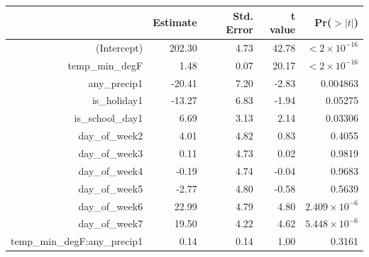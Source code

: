\documentclass[11pt,notitlepage]{article}
\newenvironment{codeSmall}%
   {\par\noindent\adjustbox{margin=1ex,bgcolor=shadecolor,margin=0ex \medskipamount}\bgroup\minipage\linewidth\verbatim\footnotesize}%
   {\endverbatim\endminipage\egroup}
\begin{document}


\begin{table}[ht]
\footnotesize
\centering
\begin{tabular}{rrrrr}
  \hline
 & Estimate & Std. Error & t value & Pr($>|t|$) \\ 
  \hline
(Intercept) & 202.30 & 4.73 & 42.78 & $<2 \times 10^{-16}$ \\ 
  temp\_min\_degF & 1.48 & 0.07 & 20.17 & $<2 \times 10^{-16}$ \\ 
  any\_precip1 & -20.41 & 7.20 & -2.83 & 0.004863 \\ 
  is\_holiday1 & -13.27 & 6.83 & -1.94 & 0.05275 \\ 
  is\_school\_day1 & 6.69 & 3.13 & 2.14 & 0.03306 \\ 
  day\_of\_week2 & 4.01 & 4.82 & 0.83 & 0.4055 \\ 
  day\_of\_week3 & 0.11 & 4.73 & 0.02 & 0.9819 \\ 
  day\_of\_week4 & -0.19 & 4.74 & -0.04 & 0.9683 \\ 
  day\_of\_week5 & -2.77 & 4.80 & -0.58 & 0.5639 \\ 
  day\_of\_week6 & 22.99 & 4.79 & 4.80 & $2.409 \times 10^{-6}$ \\ 
  day\_of\_week7 & 19.50 & 4.22 & 4.62 & $5.448 \times 10^{-6}$ \\ 
  temp\_min\_degF:any\_precip1 & 0.14 & 0.14 & 1.00 & 0.3161 \\ 
   \hline
\end{tabular}
\end{table}
\end{document}
